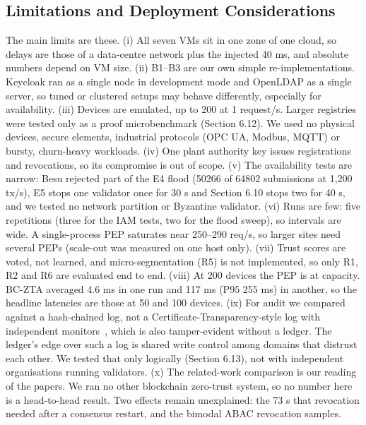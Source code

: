 \documentclass[a4paper,5p,times,twocolumn,number,sort&compress]{elsarticle}
\begin{document}
\subsection{Limitations and Deployment Considerations}

The main limits are these. (i) All seven VMs sit in one zone of one cloud, so delays are those of a data-centre network plus the injected 40 ms, and absolute numbers depend on VM size. (ii) B1--B3 are our own simple re-implementations. Keycloak ran as a single node in development mode and OpenLDAP as a single server, so tuned or clustered setups may behave differently, especially for availability. (iii) Devices are emulated, up to 200 at 1 request/s. Larger registries were tested only as a proof microbenchmark (Section 6.12). We used no physical devices, secure elements, industrial protocols (OPC UA, Modbus, MQTT) or bursty, churn-heavy workloads. (iv) One plant authority key issues registrations and revocations, so its compromise is out of scope. (v) The availability tests are narrow: Besu rejected part of the E4 flood (50266 of 64802 submissions at 1,200 tx/s), E5 stops one validator once for 30 s and Section 6.10 stops two for 40 s, and we tested no network partition or Byzantine validator. (vi) Runs are few: five repetitions (three for the IAM tests, two for the flood sweep), so intervals are wide. A single-process PEP saturates near 250--290 req/s, so larger sites need several PEPs (scale-out was measured on one host only). (vii) Trust scores are voted, not learned, and micro-segmentation (R5) is not implemented, so only R1, R2 and R6 are evaluated end to end. (viii) At 200 devices the PEP is at capacity. BC-ZTA averaged 4.6 ms in one run and 117 ms (P95 255 ms) in another, so the headline latencies are those at 50 and 100 devices. (ix) For audit we compared against a hash-chained log, not a Certificate-Transparency-style log with independent monitors~\cite{rfc6962}, which is also tamper-evident without a ledger. The ledger's edge over such a log is shared write control among domains that distrust each other. We tested that only logically (Section 6.13), not with independent organisations running validators. (x) The related-work comparison is our reading of the papers. We ran no other blockchain zero-trust system, so no number here is a head-to-head result. Two effects remain unexplained: the 73 s that revocation needed after a consensus restart, and the bimodal ABAC revocation samples.
\end{document}
